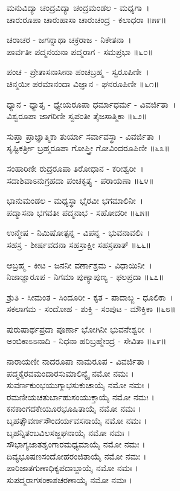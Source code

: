 ಮನುವಿದ್ಯಾ ಚಂದ್ರವಿದ್ಯಾ ಚಂದ್ರಮಂಡಲ - ಮಧ್ಯಗಾ~।\\
ಚಾರುರೂಪಾ ಚಾರುಹಾಸಾ ಚಾರುಚಂದ್ರ - ಕಲಾಧರಾ ॥೫೯॥

ಚರಾಚರ - ಜಗನ್ನಾಥಾ ಚಕ್ರರಾಜ - ನಿಕೇತನಾ~।\\
ಪಾರ್ವತೀ ಪದ್ಮನಯನಾ ಪದ್ಮರಾಗ - ಸಮಪ್ರಭಾ ॥೬೦॥

ಪಂಚ - ಪ್ರೇತಾಸನಾಸೀನಾ ಪಂಚಬ್ರಹ್ಮ - ಸ್ವರೂಪಿಣೀ~।\\
ಚಿನ್ಮಯೀ ಪರಮಾನಂದಾ ವಿಜ್ಞಾನ - ಘನರೂಪಿಣೀ ॥೬೧॥

ಧ್ಯಾನ - ಧ್ಯಾತೃ - ಧ್ಯೇಯರೂಪಾ ಧರ್ಮಾಧರ್ಮ - ವಿವರ್ಜಿತಾ~।\\
ವಿಶ್ವರೂಪಾ ಜಾಗರಿಣೀ ಸ್ವಪಂತೀ ತೈಜಸಾತ್ಮಿಕಾ ॥೬೨॥

ಸುಪ್ತಾ ಪ್ರಾಜ್ಞಾತ್ಮಿಕಾ ತುರ್ಯಾ ಸರ್ವಾವಸ್ಥಾ - ವಿವರ್ಜಿತಾ~।\\
ಸೃಷ್ಟಿಕರ್ತ್ರೀ ಬ್ರಹ್ಮರೂಪಾ ಗೋಪ್ತ್ರೀ ಗೋವಿಂದರೂಪಿಣೀ ॥೬೩॥

ಸಂಹಾರಿಣೀ ರುದ್ರರೂಪಾ ತಿರೋಧಾನ - ಕರೀಶ್ವರೀ~।\\
ಸದಾಶಿವಾಽನುಗ್ರಹದಾ ಪಂಚಕೃತ್ಯ - ಪರಾಯಣಾ ॥೬೪॥

ಭಾನುಮಂಡಲ - ಮಧ್ಯಸ್ಥಾ ಭೈರವೀ ಭಗಮಾಲಿನೀ~।\\
ಪದ್ಮಾಸನಾ ಭಗವತೀ ಪದ್ಮನಾಭ - ಸಹೋದರೀ ॥೬೫॥

ಉನ್ಮೇಷ - ನಿಮಿಷೋತ್ಪನ್ನ - ವಿಪನ್ನ - ಭುವನಾವಲಿಃ~।\\
ಸಹಸ್ರ - ಶೀರ್ಷವದನಾ ಸಹಸ್ರಾಕ್ಷೀ ಸಹಸ್ರಪಾತ್ ॥೬೬॥

ಆಬ್ರಹ್ಮ - ಕೀಟ - ಜನನೀ ವರ್ಣಾಶ್ರಮ - ವಿಧಾಯಿನೀ~।\\
ನಿಜಾಜ್ಞಾರೂಪ - ನಿಗಮಾ ಪುಣ್ಯಾಪುಣ್ಯ - ಫಲಪ್ರದಾ ॥೬೭॥

ಶ್ರುತಿ - ಸೀಮಂತ - ಸಿಂದೂರೀ - ಕೃತ - ಪಾದಾಬ್ಜ - ಧೂಲಿಕಾ~।\\
ಸಕಲಾಗಮ - ಸಂದೋಹ - ಶುಕ್ತಿ - ಸಂಪುಟ - ಮೌಕ್ತಿಕಾ ॥೬೮॥

ಪುರುಷಾರ್ಥಪ್ರದಾ ಪೂರ್ಣಾ ಭೋಗಿನೀ ಭುವನೇಶ್ವರೀ~।\\
ಅಂಬಿಕಾಽಽನಾದಿ - ನಿಧನಾ ಹರಿಬ್ರಹ್ಮೇಂದ್ರ - ಸೇವಿತಾ ॥೬೯॥

ನಾರಾಯಣೀ ನಾದರೂಪಾ ನಾಮರೂಪ - ವಿವರ್ಜಿತಾ ।\\

ಪದ್ಮಕೈರವಮಂದಾರಸುಮಾಲಿನ್ಯೈ ನಮೋ ನಮಃ ।\\
ಸುವರ್ಣಕುಂಭಯುಗ್ಮಾಭಸುಕುಚಾಯೈ ನಮೋ ನಮಃ ।\\
ರಮಣೀಯಚತುರ್ಬಾಹುಸಂಯುಕ್ತಾಯೈ ನಮೋ ನಮಃ ।\\
ಕನಕಾಂಗದಕೇಯೂರಭೂಷಿತಾಯೈ ನಮೋ ನಮಃ ।\\
ಬೃಹತ್ಸೌವರ್ಣಸೌಂದರ್ಯವಸನಾಯೈ ನಮೋ ನಮಃ ।\\
ಬೃಹನ್ನಿತಂಬವಿಲಸಜ್ಜಘನಾಯೈ ನಮೋ ನಮಃ ।\\
ಸೌಭಾಗ್ಯಜಾತಶೃಂಗಾರಮಧ್ಯಮಾಯೈ ನಮೋ ನಮಃ ।\\
ದಿವ್ಯಭೂಷಣಸಂದೋಹರಂಜಿತಾಯೈ ನಮೋ ನಮಃ ।\\
ಪಾರಿಜಾತಗುಣಾಧಿಕ್ಯಪದಾಬ್ಜಾಯೈ ನಮೋ ನಮಃ ।\\
ಸುಪದ್ಮರಾಗಸಂಕಾಶಚರಣಾಯೈ ನಮೋ ನಮಃ ।

